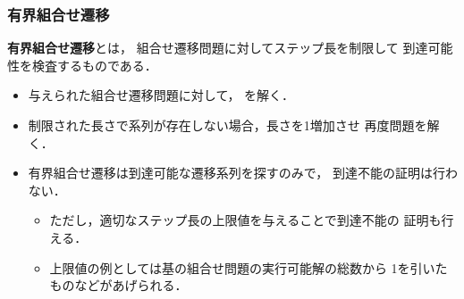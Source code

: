 \documentclass[dvipdfmx,11pt]{beamer}
\begin{document}
\begin{frame}\frametitle{有界組合せ遷移}

  \begin{alertblock}{}
    \alert{\bf 有界組合せ遷移}とは，
    組合せ遷移問題に対してステップ長を制限して
    到達可能性を検査するものである．
  \end{alertblock}

  \begin{itemize}
    \item 与えられた組合せ遷移問題に対して，
          を解く．
    \item 制限された長さで系列が存在しない場合，長さを1増加させ
          再度問題を解く．
    \item 有界組合せ遷移は到達可能な遷移系列を探すのみで，
          到達不能の証明は行わない．
          \begin{itemize}
            \item ただし，適切なステップ長の上限値を与えることで到達不能の
                  証明も行える．
            \item 上限値の例としては基の組合せ問題の実行可能解の総数から
                  1を引いたものなどがあげられる．
          \end{itemize}
  \end{itemize}

\end{frame}
\end{document}
